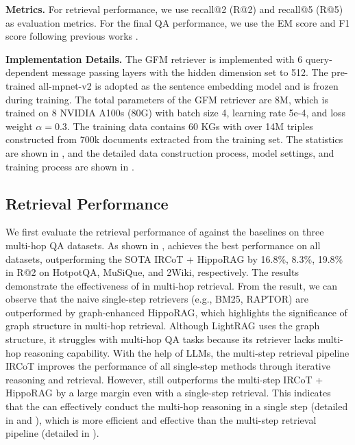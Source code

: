 \noindent\textbf{Metrics.} For retrieval performance, we use recall@2 (R@2) and recall@5 (R@5) as evaluation metrics. For the final QA performance, we use the EM score and F1 score following previous works \cite{gutiérrez2024hipporag}.

\noindent\textbf{Implementation Details.} The GFM retriever is implemented with 6 query-dependent message passing layers with the hidden dimension set to 512. The pre-trained all-mpnet-v2 \cite{all-mpnet-v2} is adopted as the sentence embedding model and is frozen during training. The total parameters of the GFM retriever are 8M, which is trained on 8 NVIDIA A100s (80G) with batch size 4, learning rate 5e-4, and loss weight $\alpha=0.3$. The training data contains 60 KGs with over 14M triples constructed from 700k documents extracted from the training set. The statistics are shown in , and the detailed data construction process, model settings, and training process are shown in .




\subsection{Retrieval Performance}\label{sec:retrieval}
We first evaluate the retrieval performance of \ourmethod against the baselines on three multi-hop QA datasets. As shown in , \ourmethod achieves the best performance on all datasets, outperforming the SOTA IRCoT + HippoRAG by 16.8\%, 8.3\%, 19.8\% in R@2 on HotpotQA, MuSiQue, and 2Wiki, respectively. The results demonstrate the effectiveness of \ourmethod in multi-hop retrieval. From the result, we can observe that the naive single-step retrievers (e.g., BM25, RAPTOR) are outperformed by graph-enhanced HippoRAG, which highlights the significance of graph structure in multi-hop retrieval. Although LightRAG uses the graph structure, it struggles with multi-hop QA tasks because its retriever lacks multi-hop reasoning capability. 
With the help of LLMs, the multi-step retrieval pipeline IRCoT improves the performance of all single-step methods through iterative reasoning and retrieval. However, \ourmethod still outperforms the multi-step IRCoT + HippoRAG by a large margin even with a single-step retrieval. This indicates that the \ourmethod can effectively conduct the multi-hop reasoning in a single step (detailed in  and ), which is more efficient and effective than the multi-step retrieval pipeline (detailed in ).

